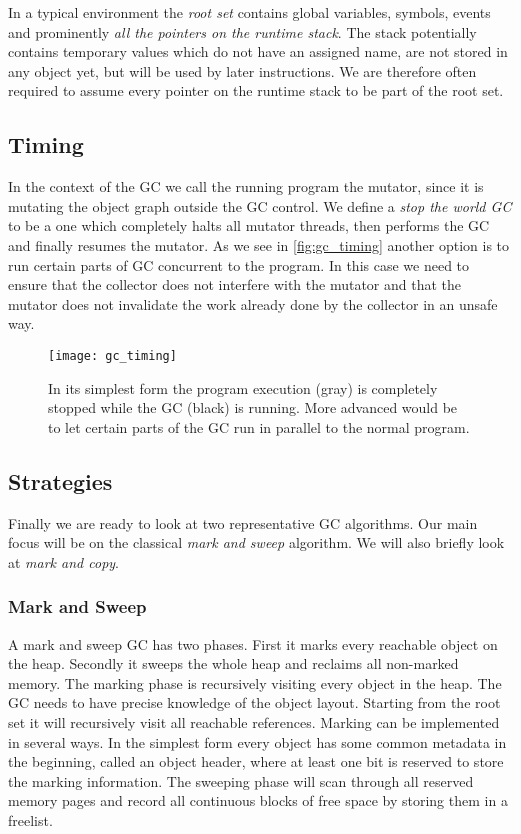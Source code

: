 In a typical environment the \emph{root set} contains \eg global variables, symbols, events and prominently \emph{all the pointers on the runtime stack}. The stack potentially contains temporary values which do not have an assigned name, are not stored in any object yet, but will be used by later instructions. We are therefore often required to assume every pointer on the runtime stack to be part of the root set.

\subsection{Timing}

In the context of the GC we call the running program the mutator, since it is mutating the object graph outside the GC control. We define a \emph{stop the world GC} to be a one which completely halts all mutator threads, then performs the GC and finally resumes the mutator. As we see in \autoref{fig:gc_timing} another option is to run certain parts of GC concurrent to the program. In this case we need to ensure that the collector does not interfere with the mutator and that the mutator does not invalidate the work already done by the collector in an unsafe way.

\begin{figure}[h]
\centering
\texttt{[image: gc\_timing]}
\caption{In its simplest form the program execution (gray) is completely stopped while the GC (black) is running. More advanced would be to let certain parts of the GC run in parallel to the normal program.}
\label{fig:gc_timing}
\end{figure}

\subsection{Strategies}

Finally we are ready to look at two representative GC algorithms. Our main focus will be on the classical \emph{mark and sweep} algorithm. We will also briefly look at \emph{mark and copy}.

\subsubsection{Mark and Sweep}

A mark and sweep GC has two phases. First it marks every reachable object on the heap. Secondly it sweeps the whole heap and reclaims all non-marked memory. The marking phase is recursively visiting every object in the heap. The GC needs to have precise knowledge of the object layout. Starting from the root set it will recursively visit all reachable references. Marking can be implemented in several ways. In the simplest form every object has some common metadata in the beginning, called an object header, where at least one bit is reserved to store the marking information. The sweeping phase will scan through all reserved memory pages and record all continuous blocks of free space by \eg storing them in a freelist. 

